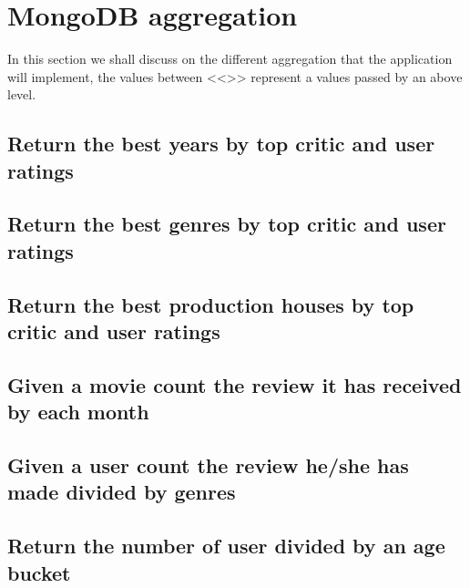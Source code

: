 


\section{MongoDB aggregation}
In this section we shall discuss on the different aggregation that the application will implement, the values between <<>> represent a values passed by an above level.
\subsection{Return the best years by top critic and user ratings}\label{subsec:bestYear}


\subsection{Return the best genres by top critic and user ratings}\label{subsec:HOFGenres}


\subsection{Return the best production houses by top critic and user ratings}\label{subsec:productionHouses}


\subsection{Given a movie count the review it has received by each month}\label{subsec:reviewByYearMonth}


\subsection{Given a user count the review he/she has made divided by genres}\label{subsec:preferredGenres}


\subsection{Return the number of user divided by an age bucket}\label{subsec:userPopulationBucket}




